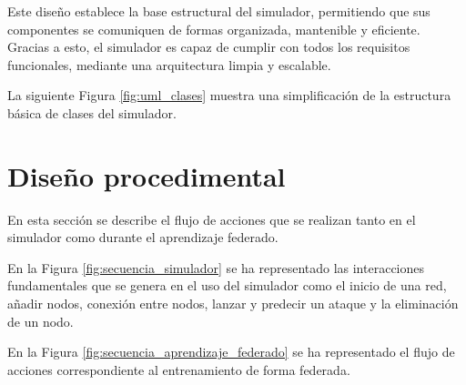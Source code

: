 Este diseño establece la base estructural del simulador, permitiendo que sus componentes se comuniquen de formas organizada, mantenible y eficiente. Gracias a esto, el simulador es capaz de cumplir con todos los requisitos funcionales, mediante una arquitectura limpia y escalable.

La siguiente Figura \ref{fig:uml_clases} muestra una simplificación de la estructura básica de clases del simulador.

\newpage

\section{Diseño procedimental}
\label{sec:DisenoProcedimental}
En esta sección se describe el flujo de acciones que se realizan tanto en el simulador como durante el aprendizaje federado.

En la Figura \ref{fig:secuencia_simulador} se ha representado las interacciones fundamentales que se genera en el uso del simulador como el inicio de una red, añadir nodos, conexión entre nodos, lanzar y predecir un ataque y la eliminación de un nodo.

En la Figura \ref{fig:secuencia_aprendizaje_federado} se ha representado el flujo de acciones correspondiente al entrenamiento de forma federada.

\newpage

